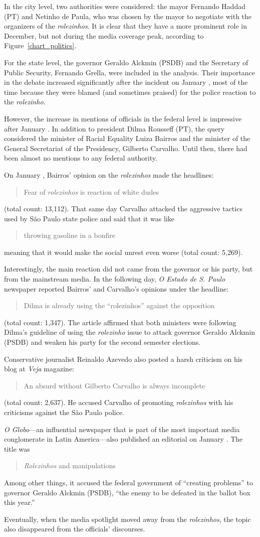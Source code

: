 In the city level, two authorities were considered: the mayor Fernando Haddad (PT) and Netinho de Paula, who was chosen by the mayor to negotiate with the organizers of the \emph{rolezinhos}. It is clear that they have a more prominent role in December, but not during the media coverage peak, according to Figure~\ref{chart_politics}.

For the state level, the governor Geraldo Alckmin (PSDB) and the Secretary of Public Security, Fernando Grella, were included in the analysis. Their importance in the debate increased significantly after the incident on January , most of the time because they were blamed (and sometimes praised) for the police reaction to the \emph{rolezinho}.

However, the increase in mentions of officials in the federal level is impressive after January . In addition to president Dilma Rousseff (PT), the query considered the minister of Racial Equality Luiza Bairros and the minister of the General Secretariat of the Presidency, Gilberto Carvalho. Until then, there had been almost no mentions to any federal authority.

On January , Bairros' opinion on the \emph{rolezinhos} made the headlines: \blockcquote{folha_medo_brancos}{Fear of \emph{rolezinhos} is reaction of white dudes} (total count: 13,112). That same day Carvalho attacked the aggressive tactics used by São Paulo state police and said that it was like \blockcquote{folha_carvalho_fogo}[,]{throwing gasoline in a bonfire} meaning that it would make the social unrest even worse (total count: 5,269).

Interestingly, the main reaction did not came from the governor or his party, but from the mainstream media. In the following day, \emph{O Estado de S. Paulo} newspaper reported Bairros' and Carvalho's opinions under the headline: \blockcquote{estado_rolezinho_oposicao}[.]{ Dilma is already using the \enquote{rolezinhos} against the opposition} (total count: 1,347). The article affirmed that both ministers were following Dilma's guideline of using the \emph{rolezinho} issue to attack governor Geraldo Alckmin (PSDB) and weaken his party for the second semester elections.

Conservative journalist Reinaldo Azevedo also posted a harsh criticism on his blog at \emph{Veja} magazine: \blockcquote{reinaldo_carvalho}{An absurd without Gilberto Carvalho is always incomplete} (total count: 2,637). He accused Carvalho of promoting \emph{rolezinhos} with his criticisms against the São Paulo police.

\emph{O Globo}---an influential newspaper that is part of the most important media conglomerate in Latin America---also published an editorial on January . The title was \blockcquote{editorial_globo}[.]{\emph{Rolezinhos} and manipulations} Among other things, it accused the federal government of \enquote{creating problems} to governor Geraldo Alckmin (PSDB), \enquote{the enemy to be defeated in the ballot box this year.}

Eventually, when the media spotlight moved away from the \emph{rolezinhos}, the topic also disappeared from the officials' discourses.